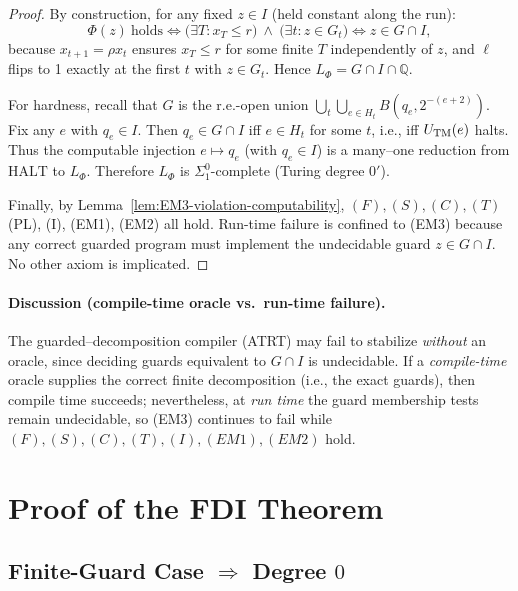 \documentclass[12pt]{article}
\theoremstyle{definition}
\theoremstyle{plain}
\begin{document}
\begin{proof}
By construction, for any fixed \(z\in I\) (held constant along the run):
\[
\Phi(z)\ \text{holds}
\iff \Big(\exists T: x_T\le r\Big)\ \wedge\ \Big(\exists t: z\in G_t\Big)
\iff z\in G\cap I,
\]
because \(x_{t+1}=\rho x_t\) ensures \(x_T\le r\) for some finite \(T\) independently of \(z\), and \(\ell\) flips to 1 exactly at the first \(t\) with \(z\in G_t\). Hence \(L_\Phi = G\cap I\cap\mathbb Q\).

For hardness, recall that \(G\) is the r.e.-open union \(\bigcup_{t}\bigcup_{e\in H_t} B(q_e,2^{-(e+2)})\).
Fix any \(e\) with \(q_e\in I\). Then \(q_e\in G\cap I\) iff \(e\in H_t\) for some \(t\), i.e., iff
\(U_{\rm TM}(e)\) halts. Thus the computable injection \(e\mapsto q_e\) (with \(q_e\in I\)) is a many–one reduction from \(\mathrm{HALT}\) to \(L_\Phi\). Therefore \(L_\Phi\) is \(\Sigma^0_1\)-complete (Turing degree \(0'\)).

Finally, by Lemma~\ref{lem:EM3-violation-computability}, \((F),(S),(C),(T)\) (PL), (I), (EM1), (EM2) all hold.
Run-time failure is confined to \textup{(EM3)} because any correct guarded program must implement the undecidable guard \(z\in G\cap I\). No other axiom is implicated.
\end{proof}

\paragraph{Discussion (compile-time oracle vs.\ run-time failure).}
The guarded–decomposition compiler (ATRT) may fail to stabilize \emph{without} an oracle, since deciding
guards equivalent to \(G\cap I\) is undecidable. If a \emph{compile-time} oracle supplies the correct finite
decomposition (i.e., the exact guards), then compile time succeeds; nevertheless, at \emph{run time} the
guard membership tests remain undecidable, so \textup{(EM3)} continues to fail while
\((F),(S),(C),(T),(I),(EM1),(EM2)\) hold.




\section{Proof of the FDI Theorem}
\subsection{Finite-Guard Case \texorpdfstring{$\Rightarrow$}{⇒} Degree $0$}
\end{document}
